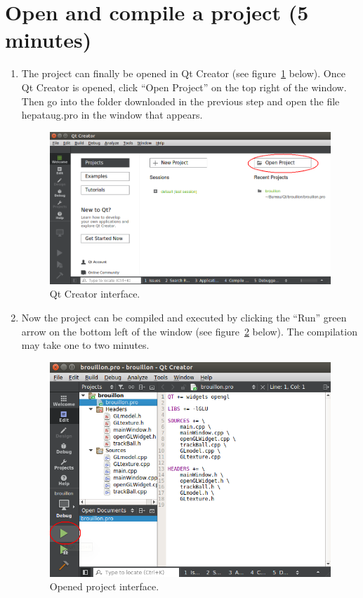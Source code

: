 \documentclass[12pt]{report}
\begin{document}
\section{Open and compile a project (5 minutes)}
\begin{enumerate}
\item The project can finally be opened in Qt Creator (see figure~\ref{qt-install-4} below). Once Qt Creator is opened, click ``Open Project'' on the top right of the window. Then go into the folder downloaded in the previous step and open the file hepataug.pro in the window that appears.

\vspace{10pt}
\begin{figure}[H]
\centerline{\includegraphics[scale = 0.5]{img/Qt-install-4.png}}
\caption{Qt Creator interface.}
\label{qt-install-4}
\end{figure}
\vspace{10pt}

\item Now the project can be compiled and executed by clicking the ``Run'' green arrow on the bottom left of the window (see figure~\ref{qt-install-5} below). The compilation may take one to two minutes.

\vspace{10pt}
\begin{figure}[H]
\centerline{\includegraphics[scale = 0.5]{img/Qt-install-5.png}}
\caption{Opened project interface.}
\label{qt-install-5}
\end{figure}
\end{enumerate}
\vspace{10pt}
\end{document}
